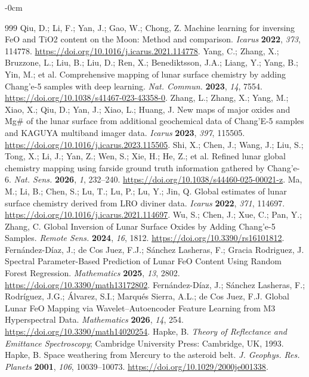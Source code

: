 \documentclass[remotesensing,article,submit,pdftex,moreauthors]{Definitions/mdpi}
\begin{document}
\begin{adjustwidth}{-\extralength}{0cm}
\begin{thebibliography}{999}
Qiu, D.; Li, F.; Yan, J.; Gao, W.; Chong, Z. Machine learning for inversing FeO and TiO2 content on the Moon: Method and comparison. \emph{Icarus} {\bf 2022}, \emph{373}, 114778. \url{https://doi.org/10.1016/j.icarus.2021.114778}.
Yang, C.; Zhang, X.; Bruzzone, L.; Liu, B.; Liu, D.; Ren, X.; Benediktsson, J.A.; Liang, Y.; Yang, B.; Yin, M.; et al. Comprehensive mapping of lunar surface chemistry by adding Chang'e-5 samples with deep learning. \emph{Nat. Commun.} {\bf 2023}, \emph{14}, 7554. \url{https://doi.org/10.1038/s41467-023-43358-0}.
Zhang, L.; Zhang, X.; Yang, M.; Xiao, X.; Qiu, D.; Yan, J.; Xiao, L.; Huang, J. New maps of major oxides and Mg\# of the lunar surface from additional geochemical data of Chang'E-5 samples and KAGUYA multiband imager data. \emph{Icarus} {\bf 2023}, \emph{397}, 115505. \url{https://doi.org/10.1016/j.icarus.2023.115505}.
Shi, X.; Chen, J.; Wang, J.; Liu, S.; Tong, X.; Li, J.; Yan, Z.; Wen, S.; Xie, H.; He, Z.; et al. Refined lunar global chemistry mapping using farside ground truth information gathered by Chang'e-6. \emph{Nat. Sens.} {\bf 2026}, \emph{1}, 232--240. \url{https://doi.org/10.1038/s44460-025-00021-z}.
Ma, M.; Li, B.; Chen, S.; Lu, T.; Lu, P.; Lu, Y.; Jin, Q. Global estimates of lunar surface chemistry derived from LRO diviner data. \emph{Icarus} {\bf 2022}, \emph{371}, 114697. \url{https://doi.org/10.1016/j.icarus.2021.114697}.
Wu, S.; Chen, J.; Xue, C.; Pan, Y.; Zhang, C. Global Inversion of Lunar Surface Oxides by Adding Chang'e-5 Samples. \emph{Remote Sens.} {\bf 2024}, \emph{16}, 1812. \url{https://doi.org/10.3390/rs16101812}.
Fernández-Díaz, J.; de Cos Juez, F.J.; Sánchez Lasheras, F.; Gracia Rodriguez, J. Spectral Parameter-Based Prediction of Lunar FeO Content Using Random Forest Regression. \emph{Mathematics} {\bf 2025}, \emph{13}, 2802. \url{https://doi.org/10.3390/math13172802}.
Fernández-Díaz, J.; Sánchez Lasheras, F.; Rodríguez, J.G.; Álvarez, S.I.; Marqués Sierra, A.L.; de Cos Juez, F.J. Global Lunar FeO Mapping via Wavelet--Autoencoder Feature Learning from M3 Hyperspectral Data. \emph{Mathematics} {\bf 2026}, \emph{14}, 254. \url{https://doi.org/10.3390/math14020254}.
Hapke, B. \emph{Theory of Reflectance and Emittance Spectroscopy}; Cambridge University Press: Cambridge, UK, 1993.
Hapke, B. Space weathering from Mercury to the asteroid belt. \emph{J. Geophys. Res. Planets} {\bf 2001}, \emph{106}, 10039--10073. \url{https://doi.org/10.1029/2000je001338}.

\end{thebibliography}
\end{adjustwidth}
\end{document}
